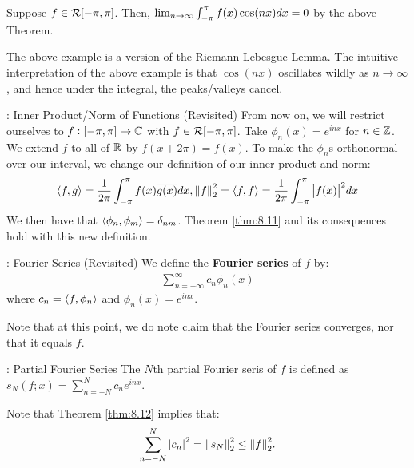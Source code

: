 \begin{nexample}{}{}
    Suppose $f \in \mathcal{R}[-\pi, \pi]$. Then, $\lim_{n \rightarrow \infty} \int_{-\pi}^{\pi} f(x)\cos(nx) dx = 0$ by the above Theorem. 
\end{nexample}
\noindent The above example is a version of the Riemann-Lebesgue Lemma. The intuitive interpretation of the above example is that $\cos(nx)$ oscillates wildly as $n \rightarrow \infty$, and hence under the integral, the peaks/valleys cancel.

\begin{ndef}{: Inner Product/Norm of Functions (Revisited)}{}
    From now on, we will restrict ourselves to $f: [-\pi, \pi] \mapsto \mathbb{C}$ with $f \in \mathcal{R}[-\pi, \pi]$. Take $\phi_n(x) = e^{inx}$ for $n \in \mathbb{Z}$. We extend $f$ to all of $\mathbb{R}$ by $f(x + 2\pi) = f(x)$. To make the $\phi_n$s orthonormal over our interval, we change our definition of our inner product and norm:
    \begin{align*}
        \left< f, g \right> = \frac{1}{2\pi}\int_{-\pi}^\pi f(x)\overline{g(x)}dx, \norm{f}_2^2 = \left< f, f \right> = \frac{1}{2\pi}\int_{-\pi}^\pi\abs{f(x)}^2 dx
    \end{align*}
    We then have that $\left< \phi_n, \phi_m \right> = \delta_{nm}$. Theorem \ref{thm:8.11} and its consequences hold with this new definition.
\end{ndef}

\begin{ndef}{: Fourier Series (Revisited)}{}
    We define the \textbf{Fourier series} of $f$ by:
    \begin{align*}
        \sum_{n=-\infty}^\infty c_n\phi_n(x)
    \end{align*}
    where $c_n = \left< f, \phi_n \right>$ and $\phi_n(x) = e^{inx}$.
\end{ndef}
\noindent Note that at this point, we do note claim that the Fourier series converges, nor that it equals $f$.

\begin{ndef}{: Partial Fourier Series}{}
    The $N$th partial Fourier seris of $f$ is defined as $s_N(f;x) = \sum_{n=-N}^N c_ne^{inx}$.
\end{ndef}
\noindent Note that Theorem \ref{thm:8.12} implies that:
\begin{align*}
    \sum_{n = -N}^{N} \abs{c_n}^2 = \norm{s_N}_2^2 \leq \norm{f}_2^2.
\end{align*}

